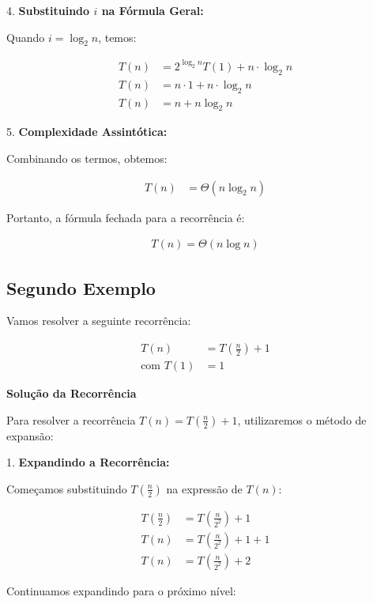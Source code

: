 \documentclass{article}
\begin{document}
4. \textbf{Substituindo \(i\) na Fórmula Geral:}

   Quando \( i = \log_2 n \), temos:

   \begin{align*}
       T(n) &= 2^{\log_2 n} T(1) + n \cdot \log_2 n \\
       T(n) &= n \cdot 1 + n \cdot \log_2 n \\
       T(n) &= n + n \log_2 n
   \end{align*}

5. \textbf{Complexidade Assintótica:}

   Combinando os termos, obtemos:

   \begin{align*}
       T(n) &= \Theta(n \log_2 n)
   \end{align*}

Portanto, a fórmula fechada para a recorrência é:

\begin{align*}
    \boxed{T(n) = \Theta(n \log n)}
\end{align*}

\subsection{Segundo Exemplo}

Vamos resolver a seguinte recorrência:

\begin{align*}
    T(n) &= T\left(\frac{n}{2}\right) + 1 \\
    \text{com } T(1) &= 1
\end{align*}

\textbf{Solução da Recorrência}

Para resolver a recorrência \(T(n) = T\left(\frac{n}{2}\right) + 1\), utilizaremos o método de expansão:

1. \textbf{Expandindo a Recorrência:}

   Começamos substituindo \(T\left(\frac{n}{2}\right)\) na expressão de \(T(n)\):

   \begin{align*}
       T\left(\frac{n}{2}\right) &= T\left(\frac{n}{2^2}\right) + 1 \\
       T(n) &= T\left(\frac{n}{2^2}\right) + 1 + 1 \\
       T(n) &= T\left(\frac{n}{2^2}\right) + 2
   \end{align*}

   Continuamos expandindo para o próximo nível:
\end{document}
